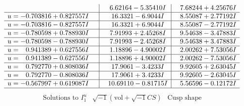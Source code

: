 \documentclass[1p]{elsarticle_modified}
\theoremstyle{definition}
\newcommand{\I}{\sqrt{-1}}
\begin{document}
$$\begin{array}{c|c|c}
 & \phantom{-}6.62164 - 5.35410 I & \phantom{-}7.68244 + 4.25676 I \\ \hline\begin{aligned}
u &= -0.703816 + 0.827557 I\end{aligned}
 & \phantom{-}16.3321 - 6.9044 I & \phantom{-}8.55087 + 2.77192 I \\ \hline\begin{aligned}
u &= -0.703816 - 0.827557 I\end{aligned}
 & \phantom{-}16.3321 + 6.9044 I & \phantom{-}8.55087 - 2.77192 I \\ \hline\begin{aligned}
u &= -0.780598 + 0.788930 I\end{aligned}
 & \phantom{-}7.91993 + 2.45268 I & \phantom{-}9.54638 - 3.47883 I \\ \hline\begin{aligned}
u &= -0.780598 - 0.788930 I\end{aligned}
 & \phantom{-}7.91993 - 2.45268 I & \phantom{-}9.54638 + 3.47883 I \\ \hline\begin{aligned}
u &= \phantom{-}0.941389 + 0.627556 I\end{aligned}
 & \phantom{-}1.18896 - 4.90002 I & \phantom{-}2.00262 + 7.53056 I \\ \hline\begin{aligned}
u &= \phantom{-}0.941389 - 0.627556 I\end{aligned}
 & \phantom{-}1.18896 + 4.90002 I & \phantom{-}2.00262 - 7.53056 I \\ \hline\begin{aligned}
u &= \phantom{-}0.792770 + 0.808036 I\end{aligned}
 & \phantom{-}17.9061 - 3.4233 I & \phantom{-}9.92605 + 2.63045 I \\ \hline\begin{aligned}
u &= \phantom{-}0.792770 - 0.808036 I\end{aligned}
 & \phantom{-}17.9061 + 3.4233 I & \phantom{-}9.92605 - 2.63045 I \\ \hline\begin{aligned}
u &= -0.567997 + 0.619087 I\end{aligned}
 & \phantom{-}10.69110 - 0.81715 I & \phantom{-}5.56596 - 0.12172 I\\
 \hline 
 \end{array}$$\newpage$$\begin{array}{c|c|c}  
\text{Solutions to }I^u_{1}& \I (\text{vol} + \sqrt{-1}CS) & \text{Cusp shape}\\

\end{array}$$
\end{document}
